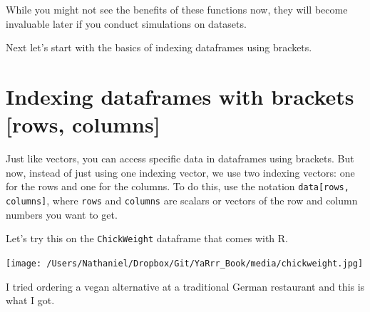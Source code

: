 \documentclass{tufte-book}\usepackage[]{graphicx}\usepackage[]{color}
\begin{document}
\begin{footnotesize}
While you might not see the benefits of these functions now, they will become invaluable later if you conduct simulations on datasets.

Next let's start with the basics of indexing dataframes using brackets.

\section{Indexing dataframes with brackets [rows, columns]}

Just like vectors, you can access specific data in dataframes using brackets. But now, instead of just using one indexing vector, we use two indexing vectors: one for the rows and one for the columns. To do this, use the notation \texttt{data[rows, columns]}, where \texttt{rows} and \texttt{columns} are scalars or vectors of the row and column numbers you want to get.

Let's try this on the \texttt{ChickWeight} dataframe that comes with R.

\begin{marginfigure}
\texttt{[image: /Users/Nathaniel/Dropbox/Git/YaRrr\_Book/media/chickweight.jpg]}
\caption{I tried ordering a vegan alternative at a traditional German restaurant and this is what I got.}
\label{fig:chickweight}
\end{marginfigure}


\end{footnotesize}
\end{document}
